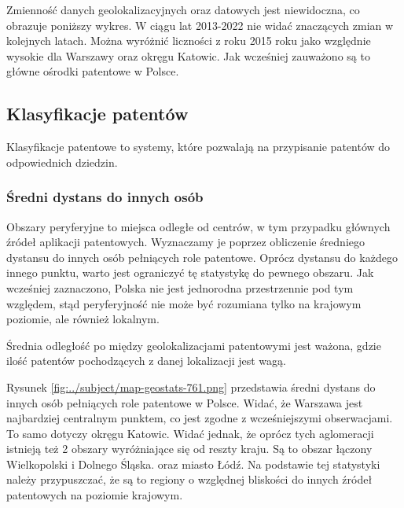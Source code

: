 Zmienność danych geolokalizacyjnych oraz datowych jest niewidoczna, co obrazuje
poniższy wykres. W ciągu lat 2013-2022 nie widać znaczących zmian w kolejnych latach.
Można wyróżnić liczności z roku 2015 roku jako względnie wysokie dla Warszawy oraz 
okręgu Katowic. Jak wcześniej zauważono są to główne ośrodki patentowe w Polsce.


\subsection{Klasyfikacje patentów}

Klasyfikacje patentowe to systemy, które pozwalają na przypisanie
patentów do odpowiednich dziedzin.



\newpage
\subsubsection{Średni dystans do innych osób}

Obszary peryferyjne to miejsca odległe od centrów, w tym przypadku
głównych źródeł aplikacji patentowych. Wyznaczamy je poprzez obliczenie
średniego dystansu do innych osób pełniących role patentowe.
Oprócz dystansu do każdego innego punktu, warto jest ograniczyć
tę statystykę do pewnego obszaru. Jak wcześniej zaznaczono, Polska
nie jest jednorodna przestrzennie pod tym względem, stąd peryferyjność
nie może być rozumiana tylko na krajowym poziomie, ale również lokalnym.

\begin{uwaga}
Średnia odległość po między geolokalizacjami patentowymi jest ważona, gdzie
ilość patentów pochodzących z danej lokalizacji jest wagą.
\end{uwaga}


Rysunek \ref{fig:../subject/map-geostats-761.png} przedstawia średni dystans
do innych osób pełniących role patentowe w Polsce. Widać, że Warszawa
jest najbardziej centralnym punktem, co jest zgodne z wcześniejszymi
obserwacjami. To samo dotyczy okręgu Katowic. Widać jednak, że oprócz
tych aglomeracji istnieją też 2 obszary wyróżniające się od reszty kraju.
Są to obszar łączony Wielkopolski i Dolnego Śląska. oraz miasto Łódź. Na podstawie tej statystyki należy przypuszczać,
że są to regiony o względnej bliskości do innych źródeł patentowych na poziomie krajowym.

